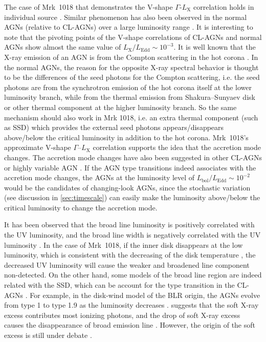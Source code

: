 \documentclass[twocolumn]{aastex63}
\begin{document}
 The case of Mrk~1018 that demonstrates the V-shape $\Gamma$-$L_\mathrm{X}$ correlation holds in individual source \citep[see also in ][etc]{2020ApJ...890L..29A}. Similar phenomenon has also been observed in the normal AGNs (relative to CL-AGNs) over a large luminosity range \citep[e.g. ][]{2009MNRAS.399..349G, 2011A&A...530A.149Y}. It is interesting to note that the pivoting points of the V-shape correlations of CL-AGNs and normal AGNs show almost the same value of $L_\mathrm{X}/L_\mathrm{Edd}\sim 10^{-3}$. It is well known that the X-ray emission of an AGN is from the Compton scattering in the hot corona \citep[e.g.][]{1991ApJ...380L..51H}. In the normal AGNs, the reason for the opposite X-ray spectral behavior is thought to be the differences of the seed photons for the Compton scattering, i.e. the seed photons are from the synchrotron emission of the hot corona itself at the lower luminosity branch, while from the thermal emission from Shakura–Sunyaev disk \citep[SSD; e.g. ][]{2013ApJ...764....2Q} or other thermal component \citep{2015MNRAS.447.1692Y} at the higher luminosity branch. So the same mechanism should also work in Mrk 1018, i.e. an extra thermal component (such as SSD) which provides the external seed photons appears/disappears above/below the critical luminosity in addition to the hot corona. Mrk~1018's approximate V-shape $\Gamma$--$L_\mathrm{X}$ correlation supports the idea that the accretion mode changes. The accretion mode changes have also been suggested in other CL-AGNs or highly variable AGN \citep{2019arXiv191203972L,2020ApJ...890L..29A,2020MNRAS.492.2335L}.  If the AGN type transitions indeed associates with the accretion mode changes, the AGNs at the luminosity level of $L_\mathrm{bol}/L_\mathrm{Edd}\sim 10^{-2}$ would be the candidates of changing-look AGNs, since the stochastic variation (see discussion in \autoref{sec:timescale}) can easily make the luminosity above/below the critical luminosity to change the accretion mode. 
 
It has been observed that the broad line luminosity is positively correlated with the UV luminosity, and the broad line width is negatively correlated with the UV luminosity \citep[e.g.][]{2019ApJ...885...44D}. In the case of Mrk~1018, if the inner disk disappears at the low luminosity, which is consistent with the decreasing of the disk temperature \citep[see also ][]{2018MNRAS.480.3898N}, the decreased UV luminosity will cause the weaker and broadened line component non-detected. On the other hand, some models of the broad line region are indeed related with the SSD, which can be account for the type transition in the CL-AGNs \citep[see a recent review in ][and references therein]{2019OAst...28..200C}. For example, in the disk-wind model of the BLR origin, the AGNs evolve from type 1 to type 1.9 as the luminosity decreases \citep[see][]{2014MNRAS.438.3340E}. \citet{2018MNRAS.480.3898N} suggests that the soft X-ray excess contributes most ionizing photons, and the drop of soft X-ray excess causes the disappearance of broad emission line \citep[see also in ][]{2020MNRAS.492.2335L}. However, the origin of the soft excess is still under debate \citep[e.g.][]{2018A&A...611A..59P}.  
\end{document}
